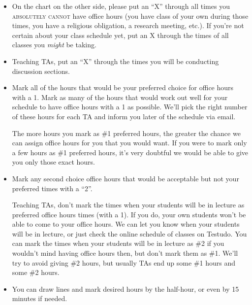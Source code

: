 \documentclass[letterpaper,11pt]{article}
\begin{document}
  \begin{itemize}

    \item On the chart on the other side, please put an ``X'' through all
          times you \textsc{absolutely cannot} have office hours (you have
          class of your own during those times, you have a religious
          obligation, a research meeting, etc.).  If you're not certain
          about your class schedule yet, put an X through the times of all
          classes you \emph{might} be taking.

    \item Teaching TAs, put an ``X'' through the times you will be
          conducting discussion sections.

    \item Mark all of the hours that would be your preferred choice for
          office hours with a 1.  Mark as many of the hours that would work
          out well for your schedule to have office hours with a 1 as
          possible.  We'll pick the right number of these hours for each TA
          and inform you later of the schedule via email.

          The more hours you mark as \#1 preferred hours, the greater the
          chance we can assign office hours for you that you would want.
          If you were to mark only a few hours as \#1 preferred hours, it's
          very doubtful we would be able to give you only those exact
          hours.

    \item Mark any second choice office hours that would be acceptable but
          not your preferred times with a ``2''.

          Teaching TAs, don't mark the times when your students will be in
          lecture as preferred office hours times (with a 1).  If you do,
          your own students won't be able to come to your office hours.  We
          can let you know when your students will be in lecture, or just
          check the online schedule of classes on Testudo.  You can mark the
          times when your students will be in lecture as \#2 if you wouldn't
          mind having office hours then, but don't mark them as \#1.  We'll
          try to avoid giving \#2 hours, but usually TAs end up some \#1
          hours and some \#2 hours.

    \item You can draw lines and mark desired hours by the half-hour, or
          even by 15 minutes if needed.


\end{itemize}
\end{document}
